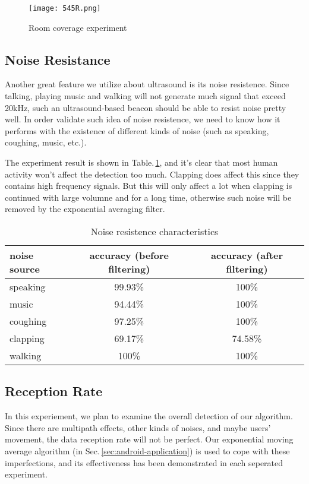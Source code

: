 \begin{figure}
  \centering
  \texttt{[image: 545R.png]}
  \vspace{-0.3cm}
  \caption{Room coverage experiment}
  \label{fig:coverage}
\end{figure}

\subsection{Noise Resistance}
\label{sec:noise-resistance}
Another great feature we utilize about ultrasound is its noise resistence. Since talking, playing music and walking will not generate much signal that exceed 20kHz, such an ultrasound-based beacon should be able to resist noise pretty well. In order validate such idea of noise resistence, we need to know how it performs with the existence of different kinds of noise (such as speaking, coughing, music, etc.). 

The experiment result is shown in Table.\,\ref{tab:noiseres}, and it's clear that most human activity won't affect the detection too much. Clapping does affect this since they contains high frequency signals. But this will only affect a lot when clapping is continued with large volumne and for a long time, otherwise such noise will be removed by the exponential averaging filter.
\begin{table}
  \centering
  \begin{tabular}{|l|c|c|}
    \hline
    noise source & accuracy (before filtering) & accuracy (after filtering) \\
    \hline
    speaking &  99.93\% & 100\% \\
    music  &  94.44\% & 100\% \\
    coughing & 97.25\% & 100\% \\
    clapping & 69.17\% & 74.58\% \\
    walking & 100\% & 100\% \\
    \hline
  \end{tabular}
  \caption{Noise resistence characteristics}
  \label{tab:noiseres}
\end{table}

\subsection{Reception Rate}
\label{sec:reception-rate}
In this experiement, we plan to examine the overall detection of our algorithm. Since there are multipath effects, other kinds of noises, and maybe users' movement, the data reception rate will not be perfect. Our exponential moving average algorithm (in Sec.\,\ref{sec:android-application}) is used to cope with these imperfections, and its effectiveness has been demonstrated in each seperated experiment.

